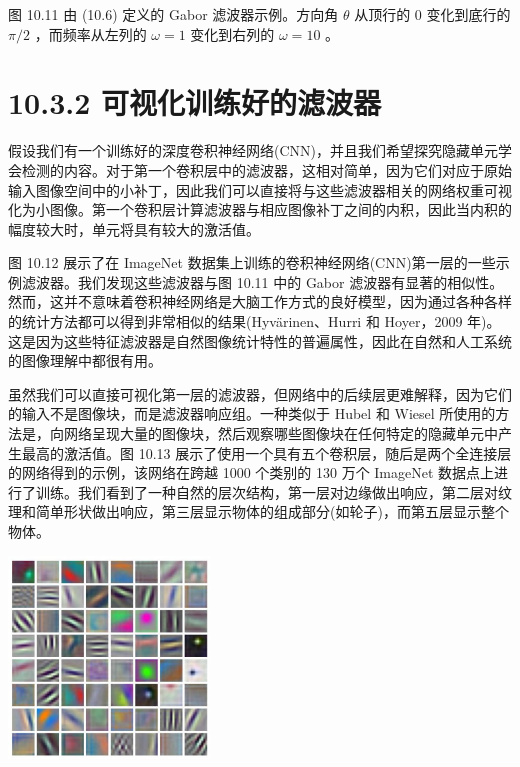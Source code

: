 \documentclass[10pt]{report}
\begin{document}
图 10.11 由 (10.6) 定义的 Gabor 滤波器示例。方向角 \(\theta\) 从顶行的 0 变化到底行的 \(\pi /2\) ，而频率从左列的 \(\omega  = 1\) 变化到右列的 \(\omega  = {10}\) 。

\section*{10.3.2 可视化训练好的滤波器}

假设我们有一个训练好的深度卷积神经网络(CNN)，并且我们希望探究隐藏单元学会检测的内容。对于第一个卷积层中的滤波器，这相对简单，因为它们对应于原始输入图像空间中的小补丁，因此我们可以直接将与这些滤波器相关的网络权重可视化为小图像。第一个卷积层计算滤波器与相应图像补丁之间的内积，因此当内积的幅度较大时，单元将具有较大的激活值。

图 10.12 展示了在 ImageNet 数据集上训练的卷积神经网络(CNN)第一层的一些示例滤波器。我们发现这些滤波器与图 10.11 中的 Gabor 滤波器有显著的相似性。然而，这并不意味着卷积神经网络是大脑工作方式的良好模型，因为通过各种各样的统计方法都可以得到非常相似的结果(Hyvärinen、Hurri 和 Hoyer，2009 年)。这是因为这些特征滤波器是自然图像统计特性的普遍属性，因此在自然和人工系统的图像理解中都很有用。

虽然我们可以直接可视化第一层的滤波器，但网络中的后续层更难解释，因为它们的输入不是图像块，而是滤波器响应组。一种类似于 Hubel 和 Wiesel 所使用的方法是，向网络呈现大量的图像块，然后观察哪些图像块在任何特定的隐藏单元中产生最高的激活值。图 10.13 展示了使用一个具有五个卷积层，随后是两个全连接层的网络得到的示例，该网络在跨越 1000 个类别的 130 万个 ImageNet 数据点上进行了训练。我们看到了一种自然的层次结构，第一层对边缘做出响应，第二层对纹理和简单形状做出响应，第三层显示物体的组成部分(如轮子)，而第五层显示整个物体。

\begin{center}
\includegraphics[max width=0.4\textwidth]{images/0194e279-9b28-703a-88f4-c3ac21e2010d_323_917_376_599_603_0.jpg}
\end{center}
\hspace*{3em} 
\end{document}
